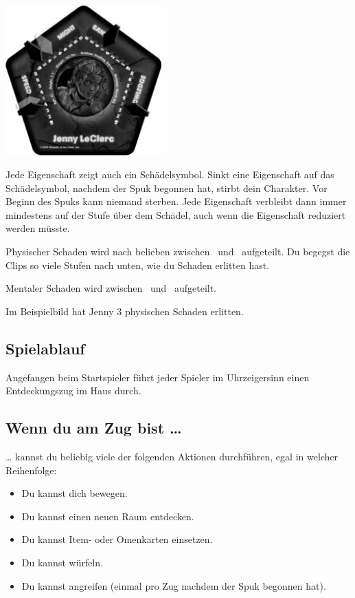\begin{center}
\includegraphics[width=6cm]{resources/traits}
\end{center}

Jede Eigenschaft zeigt auch ein Schädelsymbol. Sinkt eine Eigenschaft auf das Schädelsymbol, nachdem der Spuk begonnen hat, stirbt dein Charakter. Vor Beginn des Spuks kann niemand sterben. Jede Eigenschaft verbleibt dann immer mindestens auf der Stufe über dem Schädel, auch wenn die Eigenschaft reduziert werden müsste.

Physischer Schaden wird nach belieben zwischen \might\ und \speed\ aufgeteilt. Du begegst die Clips so viele Stufen nach unten, wie du Schaden erlitten hast.

Mentaler Schaden wird zwischen \sanity\ und \know\ aufgeteilt.

Im Beispielbild hat Jenny 3 physischen Schaden erlitten.

\subsection{Spielablauf}

Angefangen beim Startspieler führt jeder Spieler im Uhrzeigersinn einen Entdeckungszug im Haus durch.

\subsection{Wenn du am Zug bist …}
… kannst du beliebig viele der folgenden Aktionen durchführen, egal in welcher Reihenfolge:

\begin{itemize}
    \item Du kannst dich bewegen.
    \item Du kannst einen neuen Raum entdecken.
    \item Du kannst Item- oder Omenkarten einsetzen.
    \item Du kannst würfeln.
    \item Du kannst angreifen (einmal pro Zug nachdem der Spuk begonnen hat).
\end{itemize}

